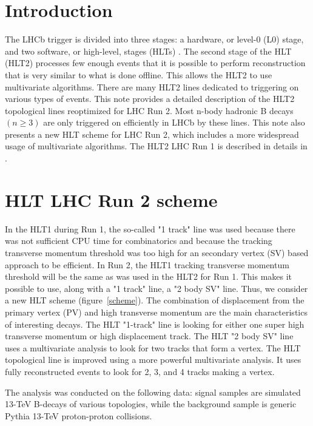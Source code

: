 \documentclass[a4paper]{jpconf}
\begin{document}
\section{Introduction}
The LHCb trigger is divided into three stages: a hardware, or level-0 (L0) stage, and two software, or high-level, stages (HLTs) \cite{trigger_system}. The second stage of the HLT (HLT2) processes few enough events that it is possible to perform reconstruction that is very similar to what is done offline. This allows the HLT2 to use multivariate algorithms. There are many HLT2 lines dedicated to triggering on various types of events. This note provides a detailed description of the HLT2 topological lines reoptimized for LHC Run 2. Most n-body hadronic B decays $(n \geq 3)$ are only triggered on efficiently in LHCb by these lines. This note also presents a new HLT scheme for LHC Run 2, which includes a more widespread usage of multivariate algorithms.  The HLT2 LHC Run 1 is described in details in \cite{topo1}.

\section{HLT LHC Run 2 scheme}
In the HLT1 during Run 1, the so-called  "1 track" line was used because there was not sufficient CPU time for combinatorics and because the tracking transverse momentum threshold was too high for an secondary vertex (SV) based approach to be efficient. In Run 2, the HLT1 tracking transverse momentum threshold will be the same as was used in the HLT2 for Run 1.  This makes it possible to use, along with a "1 track" line, a "2 body SV" line. Thus, we consider a new HLT scheme (figure~\ref{scheme}). The combination of displacement from the primary vertex (PV) and high transverse momentum are the main characteristics of interesting decays. The HLT "1-track" line is looking for either one super high transverse momentum or high displacement track. The HLT "2 body SV" line uses a multivariate analysis to look for two tracks that form a vertex. The HLT topological line is improved using a more powerful multivariate analysis. It uses fully reconstructed events to look for 2, 3, and 4 tracks making a vertex.

The analysis was conducted on the following data: signal samples are simulated 13-TeV B-decays of various topologies, while the background sample is generic Pythia 13-TeV proton-proton collisions.
\end{document}
